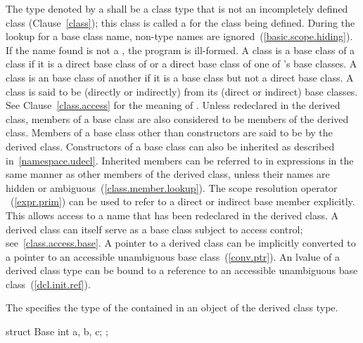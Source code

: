 \pnum
{}%
The type denoted by a  shall be
a class type that is not
an
incompletely defined class (Clause~\ref{class}); this class is called a
%
for the class being defined.
%
%
During the lookup for a base class name, non-type names are
ignored~(\ref{basic.scope.hiding}). If the name found is not a
, the program is ill-formed. A class  is a
base class of a class  if it is a direct base class of
 or a direct base class of one of 's base classes.
%
A class is an  base class of another if it is a base
class but not a direct base class. A class is said to be (directly or
indirectly)  from its (direct or indirect) base
classes.
\enternote
See Clause~\ref{class.access} for the meaning of
.
\exitnote
{}%
Unless redeclared in the derived class, members of a base class are also
considered to be members of the derived class.
Members of a base class other than constructors are said to be
%
by the derived class. Constructors of a base class
can also be inherited as described in~\ref{namespace.udecl}.
Inherited members can be referred to in
expressions in the same manner as other members of the derived class,
unless their names are hidden or ambiguous~(\ref{class.member.lookup}).
%
\enternote
The scope resolution operator \tcode{::}~(\ref{expr.prim}) can be used
to refer to a direct or indirect base member explicitly. This allows
access to a name that has been redeclared in the derived class. A
derived class can itself serve as a base class subject to access
control; see~\ref{class.access.base}. A pointer to a derived class can be
implicitly converted to a pointer to an accessible unambiguous base
class~(\ref{conv.ptr}). An lvalue of a derived class type can be bound
to a reference to an accessible unambiguous base
class~(\ref{dcl.init.ref}).
\exitnote

\pnum
The  specifies the type of the
 contained in an
object of the derived class type.
\enterexample
{}%
\begin{codeblock}
struct Base {
  int a, b, c;
};
\end{codeblock}

